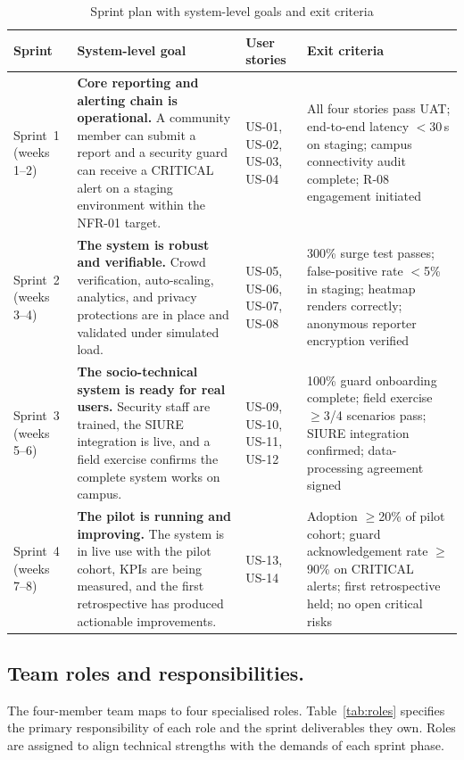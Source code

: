 \documentclass[12pt,a4paper]{article}
\begin{document}
\begin{table}[h]
\caption{Sprint plan with system-level goals and exit criteria}
\label{tab:sprints}
\centering
\begin{tabularx}{\textwidth}{p{1.4cm}Xp{4.0cm}p{3.5cm}}
\toprule
\textbf{Sprint} & \textbf{System-level goal} & \textbf{User stories} & \textbf{Exit criteria} \\
\midrule
Sprint~1 (weeks 1--2) & \textbf{Core reporting and alerting chain is operational.} A community member can submit a report and a security guard can receive a CRITICAL alert on a staging environment within the NFR-01 target. & US-01, US-02, US-03, US-04 & All four stories pass UAT; end-to-end latency $<$30\,s on staging; campus connectivity audit complete; R-08 engagement initiated \\[6pt]
Sprint~2 (weeks 3--4) & \textbf{The system is robust and verifiable.} Crowd verification, auto-scaling, analytics, and privacy protections are in place and validated under simulated load. & US-05, US-06, US-07, US-08 & 300\% surge test passes; false-positive rate $<$5\% in staging; heatmap renders correctly; anonymous reporter encryption verified \\[6pt]
Sprint~3 (weeks 5--6) & \textbf{The socio-technical system is ready for real users.} Security staff are trained, the SIURE integration is live, and a field exercise confirms the complete system works on campus. & US-09, US-10, US-11, US-12 & 100\% guard onboarding complete; field exercise $\geq$3/4 scenarios pass; SIURE integration confirmed; data-processing agreement signed \\[6pt]
Sprint~4 (weeks 7--8) & \textbf{The pilot is running and improving.} The system is in live use with the pilot cohort, KPIs are being measured, and the first retrospective has produced actionable improvements. & US-13, US-14 & Adoption $\geq$20\% of pilot cohort; guard acknowledgement rate $\geq$90\% on CRITICAL alerts; first retrospective held; no open critical risks \\[6pt]
\bottomrule
\end{tabularx}
\end{table}

\subsection{Team roles and responsibilities.}
The four-member team maps to four specialised roles.
Table~\ref{tab:roles} specifies the primary responsibility of each
role and the sprint deliverables they own. Roles are assigned
to align technical strengths with the demands of each sprint phase.
\end{document}
